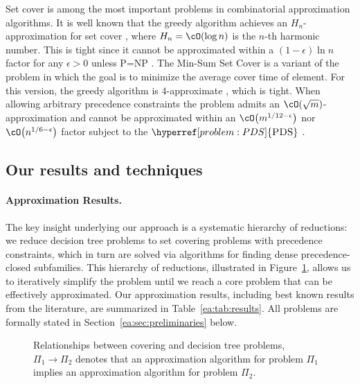 Set cover is among the most important problems in combinatorial approximation algorithms.
It is well known that the greedy algorithm achieves an $H_n$-approximation for set cover \cite{GreedyHeuristicSetCoverProblem}, where $H_n=\cO\br{\log n}$ is the $n$-th harmonic number. This is tight since it cannot be approximated within a $(1-\epsilon)\ln n$ factor for any $\epsilon > 0$ unless P=NP \cite{AnalyticalApproachToParallelRepetition}. The Min-Sum Set Cover is a variant of the problem in which the goal is to minimize the average cover time of element. For this version, the greedy algorithm is $4$-approximate \cite{ApproximatingMinSumSetCover}, which is tight. When allowing arbitrary precedence constraints the problem admits an $\cO\br{\sqrt{m}}$-approximation and cannot be approximated within an $\cO\br{m^{1/12-\epsilon}}$ nor $\cO\br{n^{1/6-\epsilon}}$ factor \cite{PCMSSC} subject to the $\hyperref[problem:PDS]{\ProblemPDS}$ \cite{OnApproxTargetSetSelection}.

\subsection{Our results and techniques} \label{ea:sec:our-results}


\paragraph{Approximation Results.} The key insight underlying our approach is a systematic hierarchy of reductions: we reduce decision tree problems to set covering problems with precedence constraints, which in turn are solved via algorithms for finding dense precedence-closed subfamilies. This hierarchy of reductions, illustrated in Figure~\ref{ea:fig:reductions}, allows us to iteratively simplify the problem until we reach a core problem that can be effectively approximated. 
Our approximation results, including best known results from the literature, are summarized in Table~\ref{ea:tab:results}.
All problems are formally stated in Section~\ref{ea:sec:preliminaries} below.

\begin{figure}[ht!]
\centering

\caption{Relationships between covering and decision tree problems, $\Pi_1 \to \Pi_2$ denotes that an approximation algorithm for problem $\Pi_1$ implies an approximation algorithm for problem $\Pi_2$.}\label{ea:fig:reductions}
\end{figure}

